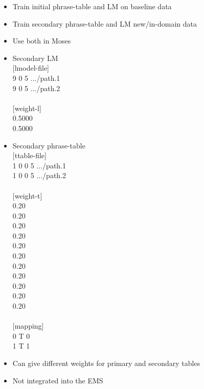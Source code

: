 \documentclass[landscape]{uedslides2C}
\begin{document}
\begin{itemize}
\item Train initial phrase-table and LM on baseline data

\item Train secondary phrase-table and LM new/in-domain data

\item Use both in Moses
  \item Secondary LM
      \\ {[}lmodel-file{]}
      \\ 9 0 5 .../path.1
      \\ 9 0 5 .../path.2
      \\
      \\ {[}weight-l{]}
      \\ 0.5000
      \\ 0.5000
  \\
  \item Secondary phrase-table
      \\ {[}ttable-file{]}
      \\ 1 0 0 5 .../path.1
      \\ 1 0 0 5 .../path.2
      \\
      \\ {[}weight-t{]}
      \\ 0.20
      \\ 0.20
      \\ 0.20
      \\ 0.20
      \\ 0.20
      \\ 0.20
      \\ 0.20
      \\ 0.20
      \\ 0.20
      \\ 0.20
      \\ 0.20
      \\
      \\ {[}mapping{]}
      \\ 0 T 0
      \\ 1 T 1

  \item Can give different weights for primary and secondary tables
  \item Not integrated into the EMS
\end{itemize}
\end{document}
